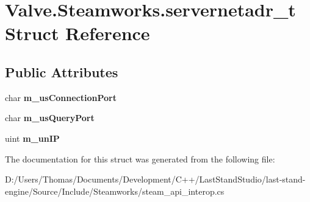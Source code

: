 \hypertarget{structValve_1_1Steamworks_1_1servernetadr__t}{}\section{Valve.\+Steamworks.\+servernetadr\+\_\+t Struct Reference}
\label{structValve_1_1Steamworks_1_1servernetadr__t}
\subsection*{Public Attributes}
\begin{DoxyCompactItemize}
\item 
\hypertarget{structValve_1_1Steamworks_1_1servernetadr__t_aa6b590f643f43034f35676e4550227fb}{}char {\bfseries m\+\_\+us\+Connection\+Port}\label{structValve_1_1Steamworks_1_1servernetadr__t_aa6b590f643f43034f35676e4550227fb}

\item 
\hypertarget{structValve_1_1Steamworks_1_1servernetadr__t_afac6fcb498d5352ca0ba51be5f5c274e}{}char {\bfseries m\+\_\+us\+Query\+Port}\label{structValve_1_1Steamworks_1_1servernetadr__t_afac6fcb498d5352ca0ba51be5f5c274e}

\item 
\hypertarget{structValve_1_1Steamworks_1_1servernetadr__t_a4987287d5cbbfe24cd922bf96ec7c79d}{}uint {\bfseries m\+\_\+un\+I\+P}\label{structValve_1_1Steamworks_1_1servernetadr__t_a4987287d5cbbfe24cd922bf96ec7c79d}

\end{DoxyCompactItemize}


The documentation for this struct was generated from the following file\+:\begin{DoxyCompactItemize}
\item 
D\+:/\+Users/\+Thomas/\+Documents/\+Development/\+C++/\+Last\+Stand\+Studio/last-\/stand-\/engine/\+Source/\+Include/\+Steamworks/steam\+\_\+api\+\_\+interop.\+cs\end{DoxyCompactItemize}
